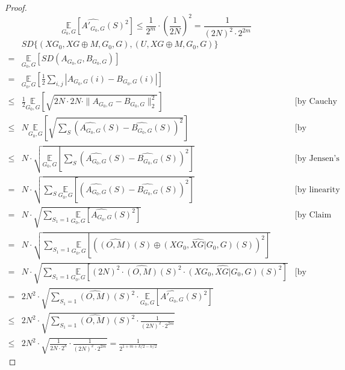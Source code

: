 \begin{proof}
$$\underset{G_0, G} {\mathbb{E}} 
	[\widehat{A'_{G_0,G}}(S)^2] \leq \frac{1}{2^m} \cdot (\frac{1}{2N})^2 
	= \frac{1}{(2N)^2 \cdot 2^{2m}}$$
\begin{align*}
& SD \{ (XG_0, XG \oplus M, G_0, G), (U, XG \oplus M, G_0, G) \} \\
= & \underset{G_0, G} {\mathbb{E}} \left[
	SD (A_{G_0,G},B_{G_0,G}) \right] \\
= & \underset{G_0, G} {\mathbb{E}} \left[
	\frac{1}{2} \sum\limits_{i,j} | A_{G_0,G}(i)- B_{G_0,G} (i)| \right] \\
\leq & \frac{1}{2} \underset{G_0, G} {\mathbb{E}} \left[ \sqrt{
	2N \cdot 2N \cdot \| A_{G_0,G} - B_{G_0,G} \|_2^2 }  \right] &\text{[by Cauchy Schwartz]} \\	
\leq & N \underset{G_0, G} {\mathbb{E}} \left[
	\sqrt{
	\sum\limits_{S} 
		(\widehat{A_{G_0,G}}(S) -
	     \widehat{B_{G_0,G}} (S) )^2 } \right] & \text{[by Parseval's Idenity]} \\
\leq & N \cdot \sqrt{
	\underset{G_0, G} {\mathbb{E}} \left[ \sum\limits_{S}   
		(\widehat{A_{G_0,G}}(S) -
	     \widehat{B_{G_0,G}} (S) )^2 \right] } & \text{[by Jensen's Inequality]}\\
= & N \cdot \sqrt{
	\sum\limits_{S} \underset{G_0, G} {\mathbb{E}} \left[  
		(\widehat{A_{G_0,G}}(S) -
	     \widehat{B_{G_0,G}} (S) )^2 \right] } & \text{[by linearity of expectation]}\\		
= & N \cdot \sqrt{
	\sum\limits_{S_1 = 1} \underset{G_0, G} {\mathbb{E}} \left[  
		\widehat{A_{G_0,G}}(S)^2 \right] } & \text{[by Claim 2.13]}\\
= & N \cdot \sqrt{
	\sum\limits_{S_1 = 1} \underset{G_0, G} {\mathbb{E}} \left[  
		(\widehat{(O, M)}(S) \oplus
		\widehat{(XG_0, XG |G_0, G)}(S))^2 \right] } \\		
= & N \cdot \sqrt{
	\sum\limits_{S_1 = 1} \underset{G_0, G} {\mathbb{E}} \left[  
		(2N)^2 \cdot \widehat{(O, M)}(S)^2 \cdot 
		\widehat{(XG_0, XG |G_0, G)}(S)^2 \right] } &\text{[by convolution]}\\
=& 2N^2 \cdot \sqrt{
	\sum\limits_{S_1 = 1} \widehat{(O, M)}(S)^2 \cdot 
		\underset{G_0, G} {\mathbb{E}} \left[  
		\widehat{A'_{G_0,G}}(S)^2 \right] } 	\\ 
\leq & 2N^2 \cdot  \sqrt{
	\sum\limits_{S_1 = 1} \widehat{(O, M)}(S)^2 \cdot 
		\frac{1} {(2N)^2 \cdot 2^{2m}} }	\\
\leq &	2N^2 \cdot \sqrt{
	\frac{1}{2N \cdot 2^k} \cdot 
		\frac{1} {(2N)^2 \cdot 2^{2m}} }
=  \frac{1}{2^{1+m+k/2 - n/2}}						     		                                 
\end{align*} 
\end{proof}

